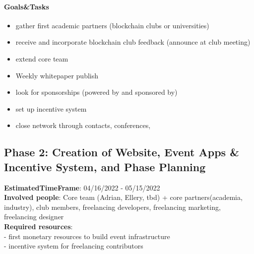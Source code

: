 \paragraph{Goals\&Tasks}
\begin{itemize}
    \item gather first academic partners (blockchain clubs or universities)
    \item receive and incorporate blockchain club feedback (announce at club meeting)
    \item extend core team
    \item Weekly whitepaper publish
    \item look for sponsorships (powered by and sponsored by)
    \item set up incentive system
    \item close network through contacts, conferences, 
\end{itemize}

\subsection*{Phase 2: Creation of Website, Event Apps \& Incentive System, and Phase Planning}
\textbf{EstimatedTimeFrame}:
04/16/2022 - 05/15/2022 \\
\textbf{Involved people}:
Core team (Adrian, Ellery, tbd) + core partners(academia, industry), club members, freelancing developers, freelancing marketing, freelancing designer \\
\textbf{Required resources}: \\
- first monetary resources to build event infrastructure \\
- incentive system for freelancing contributors \\

